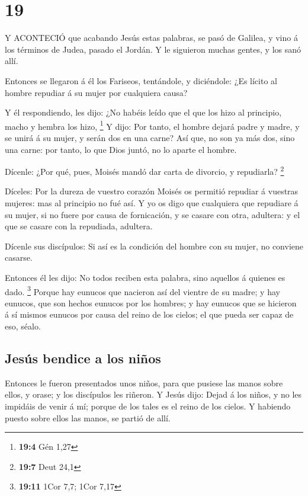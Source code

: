 \hypertarget{section-18}{%
\section{19}\label{section-18}}

 Y ACONTECIÓ que acabando Jesús estas palabras, se pasó de
Galilea, y vino á los términos de Judea, pasado el Jordán. 
Y le siguieron muchas gentes, y los sanó allí.

 Entonces se llegaron á él los Fariseos, tentándole, y
diciéndole: ¿Es lícito al hombre repudiar á su mujer por cualquiera
causa?

 Y él respondiendo, les dijo: ¿No habéis leído que el que
los hizo al principio, macho y hembra los hizo, \footnote{\textbf{19:4}
  Gén 1,27}  Y dijo: Por tanto, el hombre dejará padre y
madre, y se unirá á su mujer, y serán dos en una carne?  Así
que, no son ya más dos, sino una carne: por tanto, lo que Dios juntó, no
lo aparte el hombre.

 Dícenle: ¿Por qué, pues, Moisés mandó dar carta de
divorcio, y repudiarla? \footnote{\textbf{19:7} Deut 24,1}

 Díceles: Por la dureza de vuestro corazón Moisés os
permitió repudiar á vuestras mujeres: mas al principio no fué así.
 Y yo os digo que cualquiera que repudiare á su mujer, si no
fuere por causa de fornicación, y se casare con otra, adultera: y el que
se casare con la repudiada, adultera.

 Dícenle sus discípulos: Si así es la condición del hombre
con su mujer, no conviene casarse.

 Entonces él les dijo: No todos reciben esta palabra, sino
aquellos á quienes es dado. \footnote{\textbf{19:11} 1Cor 7,7; 1Cor 7,17}
 Porque hay eunucos que nacieron así del vientre de su
madre; y hay eunucos, que son hechos eunucos por los hombres; y hay
eunucos que se hicieron á sí mismos eunucos por causa del reino de los
cielos; el que pueda ser capaz de eso, séalo.

\hypertarget{jesuxfas-bendice-a-los-niuxf1os}{%
\subsection{Jesús bendice a los
niños}\label{jesuxfas-bendice-a-los-niuxf1os}}

 Entonces le fueron presentados unos niños, para que
pusiese las manos sobre ellos, y orase; y los discípulos les riñeron.
 Y Jesús dijo: Dejad á los niños, y no les impidáis de
venir á mí; porque de los tales es el reino de los cielos. 
Y habiendo puesto sobre ellos las manos, se partió de allí.


